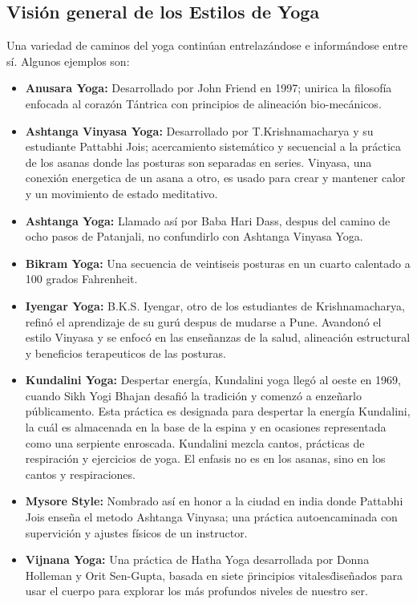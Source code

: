 \begin{itemize}
\section{Visión general de los Estilos de Yoga}
Una variedad de caminos del yoga continúan entrelazándose e informándose entre sí. Algunos ejemplos son:
\begin{itemize}
	\item \textbf{Anusara Yoga:} Desarrollado por John Friend en 1997; unirica la filosofía enfocada al corazón Tántrica con principios de alineación bio-mecánicos.
	\item \textbf{Ashtanga Vinyasa Yoga:} Desarrollado por T.Krishnamacharya y su estudiante Pattabhi Jois; acercamiento sistemático y secuencial a la práctica de los asanas donde las posturas son separadas en series. Vinyasa, una conexión energetica de un asana a otro, es usado para crear y mantener calor y un movimiento de estado meditativo.
	\item \textbf{Ashtanga Yoga:} Llamado así por Baba Hari Dass, despus del camino de ocho pasos de Patanjali, no confundirlo con Ashtanga Vinyasa Yoga.
	\item \textbf{Bikram Yoga:} Una secuencia de veintiseis posturas en un cuarto calentado a 100 grados Fahrenheit.
	\item \textbf{Iyengar Yoga:} B.K.S. Iyengar, otro de los estudiantes de Krishnamacharya, refinó el aprendizaje de su gurú despus de mudarse a Pune. Avandonó el estilo Vinyasa y se enfocó en las enseñanzas de la salud, alineación estructural y beneficios terapeuticos de las posturas.
	\item \textbf{Kundalini Yoga:} Despertar energía, Kundalini yoga llegó al oeste en 1969, cuando Sikh Yogi Bhajan desafió la tradición y comenzó a enzeñarlo públicamento. Esta práctica es designada para despertar la energía Kundalini, la cuál es almacenada en la base de la espina y en ocasiones representada como una serpiente enroscada. Kundalini mezcla cantos, prácticas de respiración y ejercicios de yoga. El enfasis no es en los asanas, sino en los cantos y respiraciones.
	\item \textbf{Mysore Style:} Nombrado así en honor a la ciudad en india donde Pattabhi Jois enseña el metodo Ashtanga Vinyasa; una práctica autoencaminada con supervición y ajustes físicos de un instructor.
	\item \textbf{Vijnana Yoga:} Una práctica de Hatha Yoga desarrollada por Donna Holleman y Orit Sen-Gupta, basada en siete \"principios vitales\" diseñados para usar el cuerpo para explorar los más profundos niveles de nuestro ser.

\end{itemize}
\end{itemize}
